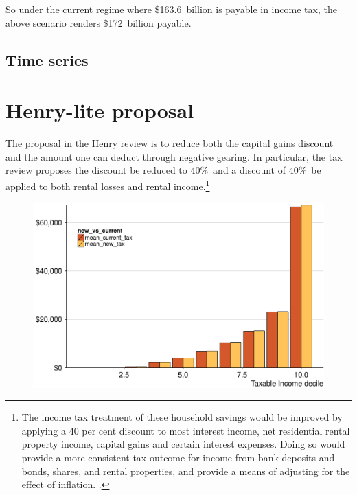 \documentclass{grattan}\usepackage[]{graphicx}\usepackage[]{color}
\begin{document}
So under the current regime where \$163.6~billion is payable in income tax, the above scenario renders \$172~billion payable.
\clearpage


\subsection{Time series}





\section{Henry-lite proposal}
The proposal in the Henry review is to reduce both the capital gains discount and the amount one can deduct through negative gearing. In particular, the tax review proposes the discount be reduced to 40\%\ and a discount of 40\%\ be applied to both rental losses and rental income.\footnote{The income tax treatment of these household savings would be improved by applying a
40 per cent discount to most interest income, net residential rental property income, capital
gains and certain interest expenses. Doing so would provide a more consistent tax
outcome for income from bank deposits and bonds, shares, and rental properties, and
provide a means of adjusting for the effect of inflation. \textcite{Treasury2010a}.}




\begin{figure}
\includegraphics[width=\columnwidth]{figure/Henry_proposal_change_in_tax_burden_by_decile-1}
\notes{}

\source{}
\end{figure}
\end{document}

